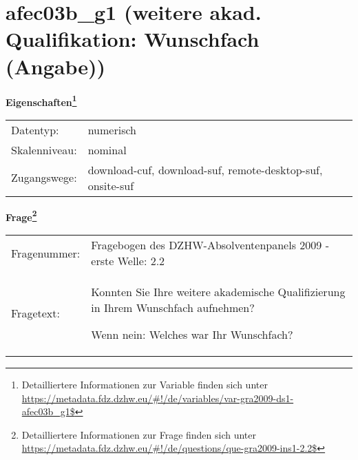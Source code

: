 
    \setcounter{footnote}{0}

    \vspace*{-1.8cm}
	\section{afec03b\_g1 (weitere akad. Qualifikation: Wunschfach (Angabe))}
	\label{section:afec03b_g1}



    \vspace*{0.5cm}
    \noindent\textbf{Eigenschaften\footnote{Detailliertere Informationen zur Variable finden sich unter
		\url{https://metadata.fdz.dzhw.eu/\#!/de/variables/var-gra2009-ds1-afec03b_g1$}}}\\
	\begin{tabularx}{\hsize}{@{}lX}
	Datentyp: & numerisch \\
	Skalenniveau: & nominal \\
	Zugangswege: &
	  download-cuf, 
	  download-suf, 
	  remote-desktop-suf, 
	  onsite-suf
 \\
    \end{tabularx}



				\vspace*{0.5cm}
                \noindent\textbf{Frage\footnote{Detailliertere Informationen zur Frage finden sich unter
		              \url{https://metadata.fdz.dzhw.eu/\#!/de/questions/que-gra2009-ins1-2.2$}}}\\
				\begin{tabularx}{\hsize}{@{}lX}
					Fragenummer: &
					  Fragebogen des DZHW-Absolventenpanels 2009 - erste Welle:
					  2.2
 \\
					Fragetext: & Konnten Sie Ihre weitere akademische Qualifizierung in Ihrem Wunschfach aufnehmen?\par  Wenn nein: Welches war Ihr Wunschfach? \\
				\end{tabularx}





